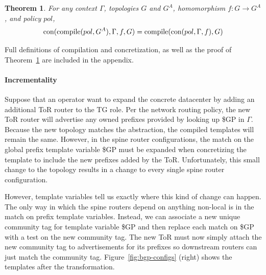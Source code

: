 \documentclass[numbers, 10pt, preprint]{sigplanconf}
\newcommand{\para}[1]{\paragraph*{\textbf{#1}}}
\newtheorem{thm}{Theorem}[section]
\begin{document}


\begin{thm}
  For any context $\Gamma$, topologies $G$ and $G^A$, homomorphism $f : G \rightarrow G^A$, and policy $pol$,
  $$\text{con}(\text{compile}(pol,G^A), \Gamma,f,G) = \text{compile}(\text{con}(pol,\Gamma,f),G)$$
  \label{thm:concretization}
\end{thm}
%
\vspace{-1em}
Full definitions of compilation and concretization, as well as the proof of Theorem~\ref{thm:concretization} are included in the appendix.


\para{Incrementality}

Suppose that an operator want to expand the concrete datacenter by adding an additional ToR router to the TG role. Per the network routing policy, the new ToR router will advertise any owned prefixes provided by looking up {\small \$GP} in $\Gamma$. Because the new topology matches the abstraction, the compiled templates will remain the same. However, in the spine router configurations, the match on the global prefix template variable {\small \$GP} must be expanded when concretizing the template to include the new prefixes added by the ToR. Unfortunately, this small change to the topology results in a change to every single spine router configuration.

However, template variables tell us exactly where this kind of change can happen. The only way in which the spine routers depend on anything non-local is in the match on prefix template variables. Instead, we can associate a new unique community tag for template variable {\small \$GP} and then replace each match on {\small \$GP} with a test on the new community tag. The new ToR must now simply attach the new community tag to advertisements for its prefixes so downstream routers can just match the community tag. Figure~\ref{fig:bgp-configs} (right) shows the templates after the transformation.
\end{document}
